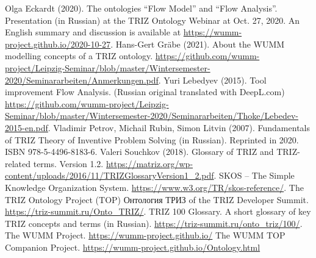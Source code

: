 \documentclass[11pt,a4paper]{article}
\begin{document}
\begin{thebibliography}{xxx}
\raggedright
{} Olga Eckardt (2020).  The ontologies “Flow Model” and
  “Flow Analysis”. Presentation (in Russian) at the TRIZ Ontology Webinar at
  Oct. 27, 2020.  An English summary and discussion is available at
  \url{https://wumm-project.github.io/2020-10-27}.
 Hans-Gert Gr\"abe (2021). About the WUMM modelling
  concepts of a TRIZ ontology.  \url{https://github.com/wumm-project/Leipzig-Seminar/blob/master/Wintersemester-2020/Seminararbeiten/Anmerkungen.pdf}.
 Yuri Lebedyev (2015). Tool improvement Flow Analysis. (Russian original translated with DeepL.com)
  \url{https://github.com/wumm-project/Leipzig-Seminar/blob/master/Wintersemester-2020/Seminararbeiten/Thoke/Lebedev-2015-en.pdf}.
 Vladimir Petrov, Michail Rubin, Simon Litvin (2007).
  Fundamentals of TRIZ Theory of Inventive Problem Solving (in Russian).
  Reprinted in 2020. ISBN 978-5-4496-8183-6.
 Valeri Souchkov (2018).  Glossary of TRIZ and
  TRIZ-related terms. Version 1.2.
  \url{https://matriz.org/wp-content/uploads/2016/11/TRIZGlossaryVersion1_2.pdf}. 
 SKOS -- The Simple Knowledge Organization System.
  \url{https://www.w3.org/TR/skos-reference/}.  
 The TRIZ Ontology Project (TOP)
  \foreignlanguage{russian}{Онтология ТРИЗ} of the TRIZ Developer Summit.
  \url{https://triz-summit.ru/Onto_TRIZ/}.
 TRIZ 100 Glossary. A short glossary of key TRIZ
  concepts and terms (in Russian).
  \url{https://triz-summit.ru/onto_triz/100/}.
 The WUMM Project. \url{https://wumm-project.github.io/} 
 The WUMM TOP Companion Project.
  \url{https://wumm-project.github.io/Ontology.html} 
\end{thebibliography}
\end{document}
